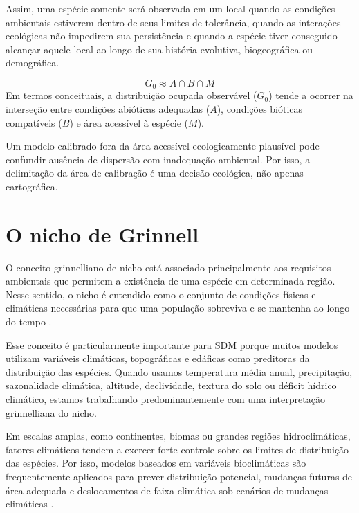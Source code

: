 \documentclass{ueap-sdm}
\begin{document}
Assim, uma espécie somente será observada em um local quando as condições ambientais estiverem dentro de seus limites de tolerância, quando as interações ecológicas não impedirem sua persistência e quando a espécie tiver conseguido alcançar aquele local ao longo de sua história evolutiva, biogeográfica ou demográfica.

\begin{equationbox}
\[
G_0 \approx A \cap B \cap M
\]
Em termos conceituais, a distribuição ocupada observável ($G_0$) tende a ocorrer na interseção entre condições abióticas adequadas ($A$), condições bióticas compatíveis ($B$) e área acessível à espécie ($M$).
\end{equationbox}

\begin{atencao}
Um modelo calibrado fora da área acessível ecologicamente plausível pode confundir ausência de dispersão com inadequação ambiental. Por isso, a delimitação da área de calibração é uma decisão ecológica, não apenas cartográfica.
\end{atencao}

\section{O nicho de Grinnell}

O conceito grinnelliano de nicho está associado principalmente aos requisitos ambientais que permitem a existência de uma espécie em determinada região. Nesse sentido, o nicho é entendido como o conjunto de condições físicas e climáticas necessárias para que uma população sobreviva e se mantenha ao longo do tempo \parencite{grinnell1917,soberon2007}.

Esse conceito é particularmente importante para SDM porque muitos modelos utilizam variáveis climáticas, topográficas e edáficas como preditoras da distribuição das espécies. Quando usamos temperatura média anual, precipitação, sazonalidade climática, altitude, declividade, textura do solo ou déficit hídrico climático, estamos trabalhando predominantemente com uma interpretação grinnelliana do nicho.

Em escalas amplas, como continentes, biomas ou grandes regiões hidroclimáticas, fatores climáticos tendem a exercer forte controle sobre os limites de distribuição das espécies. Por isso, modelos baseados em variáveis bioclimáticas são frequentemente aplicados para prever distribuição potencial, mudanças futuras de área adequada e deslocamentos de faixa climática sob cenários de mudanças climáticas \parencite{guisan2005predicting,elith2009,guisan2017habitat}.
\end{document}
